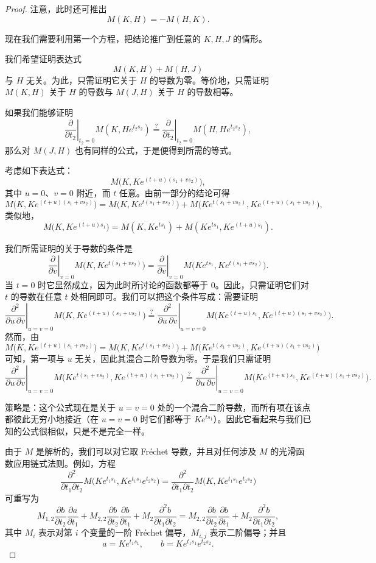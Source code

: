 \begin{proposition}[{\cite[Proposition~5.1]{Si1}}]
\begin{proof}
注意，此时还可推出
\[
M(K,H)=-M(H,K).
\]

现在我们需要利用第一个方程，把结论推广到任意的 \(K,H,J\) 的情形。

我们希望证明表达式
\[
M(K,H)+M(H,J)
\]
与 \(H\) 无关。为此，只需证明它关于 \(H\) 的导数为零。等价地，只需证明 \(M(K,H)\) 关于 \(H\) 的导数与 \(M(J,H)\) 关于 \(H\) 的导数相等。

如果我们能够证明
\[
\left.\frac{\partial}{\partial t_2}\right|_{t_2=0}M(K,He^{t_2s_2})
\stackrel{?}{=}
\left.\frac{\partial}{\partial t_2}\right|_{t_2=0}M(H,He^{t_2s_2}),
\]
那么对 \(M(J,H)\) 也有同样的公式，于是便得到所需的等式。

考虑如下表达式：
\[
M\bigl(K,Ke^{(t+u)(s_1+vs_2)}\bigr),
\]
其中 \(u=0\)、\(v=0\) 附近，而 \(t\) 任意。由前一部分的结论可得
\[
M\bigl(K,Ke^{(t+u)(s_1+vs_2)}\bigr)
=
M\bigl(K,Ke^{t(s_1+vs_2)}\bigr)
+
M\bigl(Ke^{t(s_1+vs_2)},Ke^{(t+u)(s_1+vs_2)}\bigr),
\]
类似地，
\[
M\bigl(K,Ke^{(t+u)s_1}\bigr)
=
M(K,Ke^{ts_1})
+
M(Ke^{ts_1},Ke^{(t+u)s_1}).
\]

我们所需证明的关于导数的条件是
\[
\left.\frac{\partial}{\partial v}\right|_{v=0}
M\bigl(K,Ke^{t(s_1+vs_2)}\bigr)
=
\left.\frac{\partial}{\partial v}\right|_{v=0}
M\bigl(Ke^{ts_1},Ke^{t(s_1+vs_2)}\bigr).
\]
当 \(t=0\) 时它显然成立，因为此时所讨论的函数都等于 \(0\)。因此，只需证明它们对 \(t\) 的导数在任意 \(t\) 处相同即可。我们可以把这个条件写成：需要证明
\[
\left.\frac{\partial^2}{\partial u\,\partial v}\right|_{u=v=0}
M\bigl(K,Ke^{(t+u)(s_1+vs_2)}\bigr)
\stackrel{?}{=}
\left.\frac{\partial^2}{\partial u\,\partial v}\right|_{u=v=0}
M\bigl(Ke^{(t+u)s_1},Ke^{(t+u)(s_1+vs_2)}\bigr).
\]
然而，由
\[
M\bigl(K,Ke^{(t+u)(s_1+vs_2)}\bigr)
=
M\bigl(K,Ke^{t(s_1+vs_2)}\bigr)
+
M\bigl(Ke^{t(s_1+vs_2)},Ke^{(t+u)(s_1+vs_2)}\bigr)
\]
可知，第一项与 \(u\) 无关，因此其混合二阶导数为零。于是我们只需证明
\[
\left.\frac{\partial^2}{\partial u\,\partial v}\right|_{u=v=0}
M\bigl(Ke^{t(s_1+vs_2)},Ke^{(t+u)(s_1+vs_2)}\bigr)
\stackrel{?}{=}
\left.\frac{\partial^2}{\partial u\,\partial v}\right|_{u=v=0}
M\bigl(Ke^{(t+u)s_1},Ke^{(t+u)(s_1+vs_2)}\bigr).
\]

策略是：这个公式现在是关于 \(u=v=0\) 处的一个混合二阶导数，而所有项在该点都彼此无穷小地接近（在 \(u=v=0\) 时它们都等于 \(Ke^{ts_1}\)）。因此它看起来与我们已知的公式很相似，只是不是完全一样。

由于 \(M\) 是解析的，我们可以对它取 Fr\'echet 导数，并且对任何涉及 \(M\) 的光滑函数应用链式法则。例如，方程
\[
\frac{\partial^2}{\partial t_1\partial t_2}
M\bigl(Ke^{t_1s_1},Ke^{t_1s_1}e^{t_2s_2}\bigr)
=
\frac{\partial^2}{\partial t_1\partial t_2}
M\bigl(K,Ke^{t_1s_1}e^{t_2s_2}\bigr)
\]
可重写为
\[
M_{1,2}\frac{\partial b}{\partial t_2}\frac{\partial a}{\partial t_1}
+
M_{2,2}\frac{\partial b}{\partial t_2}\frac{\partial b}{\partial t_1}
+
M_2\frac{\partial^2 b}{\partial t_1\partial t_2}
=
M_{2,2}\frac{\partial b}{\partial t_2}\frac{\partial b}{\partial t_1}
+
M_2\frac{\partial^2 b}{\partial t_1\partial t_2},
\]
其中 \(M_i\) 表示对第 \(i\) 个变量的一阶 Fr\'echet 偏导，\(M_{i,j}\) 表示二阶偏导；并且
\[
a=Ke^{t_1s_1},\qquad b=Ke^{t_1s_1}e^{t_2s_2}.
\]


\end{proof}
\end{proposition}
